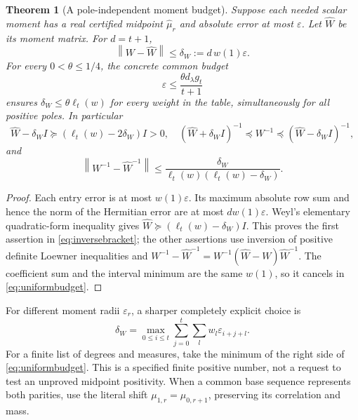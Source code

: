 \documentclass[11pt]{article}
\newtheorem{theorem}{Theorem}
\newcommand{\norm}[1]{\left\lVert#1\right\rVert}
\begin{document}
\begin{theorem}[A pole-independent moment budget]\label{thm:budget}
Suppose each needed scalar moment has a real certified midpoint
$\widehat\mu_r$ and absolute error at most $\varepsilon$.
Let $\widehat W$ be its moment matrix. For $d=t+1$,
\begin{equation}\label{eq:deltaW}
 \norm{W-\widehat W}\le\delta_W:=d\,w(1)\varepsilon.
\end{equation}
For every $0<\theta\le1/4$, the concrete common budget
\begin{equation}\label{eq:uniformbudget}
 \boxed{\varepsilon\le\frac{\theta d_\lambda g_t}{t+1}}
\end{equation}
ensures $\delta_W\le\theta\ell_t(w)$ for every weight in
the table, simultaneously for all positive poles. In particular
\begin{equation}\label{eq:inversebracket}
 \widehat W-\delta_W I\succeq(\ell_t(w)-2\delta_W)I>0,
 \quad
 (\widehat W+\delta_W I)^{-1}\preceq W^{-1}
 \preceq(\widehat W-\delta_W I)^{-1},
\end{equation}
and
\begin{equation}\label{eq:inverseerror}
 \norm{W^{-1}-\widehat W^{-1}}
 \le\frac{\delta_W}{\ell_t(w)(\ell_t(w)-\delta_W)}.
\end{equation}
\end{theorem}
\begin{proof}
Each entry error is at most $w(1)\varepsilon$. Its maximum
absolute row sum and hence the norm of the Hermitian error are
at most $d w(1)\varepsilon$. Weyl's elementary quadratic-form
inequality gives $\widehat W\succeq(\ell_t(w)-\delta_W)I$.
This proves the first assertion in \eqref{eq:inversebracket};
the other assertions use inversion of positive definite Loewner
inequalities and
$W^{-1}-\widehat W^{-1}=W^{-1}(\widehat W-W)\widehat W^{-1}$.
The coefficient sum and the interval minimum are the same $w(1)$,
so it cancels in \eqref{eq:uniformbudget}.
\end{proof}

For different moment radii $\varepsilon_r$, a sharper completely
explicit choice is
\[
 \delta_W=\max_{0\le i\le t}\sum_{j=0}^t
                \sum_lw_l\varepsilon_{i+j+l}.
\]
For a finite list of degrees and measures, take the minimum of the
right side of \eqref{eq:uniformbudget}. This is a specified finite
positive number, not a request to test an unproved midpoint
positivity. When a common base sequence represents both parities,
use the literal shift $\mu_{1,r}=\mu_{0,r+1}$, preserving its
correlation and mass.
\end{document}
